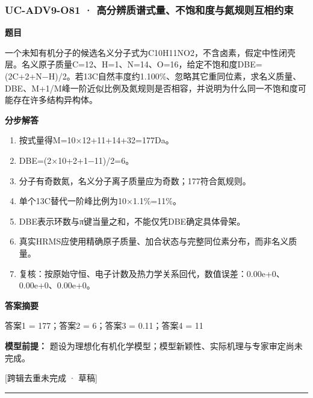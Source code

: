 \documentclass[UTF8,11pt,a4paper]{ctexart}
\begin{document}
\subsubsection*{UC-ADV9-O81 · 高分辨质谱式量、不饱和度与氮规则互相约束}
\noindent\textbf{题目}\par
一个未知有机分子的候选名义分子式为C10H11NO2，不含卤素，假定中性闭壳层。名义原子质量C=12、H=1、N=14、O=16，给定不饱和度DBE=(2C+2+N−H)/2。若13C自然丰度约1.100\%、忽略其它重同位素，求名义质量、DBE、M+1/M峰一阶近似比例及氮规则是否相容，并说明为什么同一不饱和度可能存在许多结构异构体。\par
\medskip\noindent\textbf{分步解答}
\begin{enumerate}
\item 按式量得M=10×12+11+14+32=177Da。
\item DBE=(2×10+2+1−11)/2=6。
\item 分子有奇数氮，名义分子离子质量应为奇数；177符合氮规则。
\item 单个13C替代一阶峰比例为10×1.1\%=11\%。
\item DBE表示环数与π键当量之和，不能仅凭DBE确定具体骨架。
\item 真实HRMS应使用精确原子质量、加合状态与完整同位素分布，而非名义质量。
\item 复核：按原始守恒、电子计数及热力学关系回代，数值误差：0.00e+0、0.00e+0、0.00e+0。
\end{enumerate}
\noindent\textbf{答案摘要}\par
答案1 = 177；答案2 = 6；答案3 = 0.11；答案4 = 11\par
\noindent\textbf{模型前提：}
题设为理想化有机化学模型；模型新颖性、实际机理与专家审定尚未完成。\par
\noindent\textcolor{red!65!black}{[跨辑去重未完成 · 草稿]} \par
\medskip\hrule\medskip
{}
\end{document}
